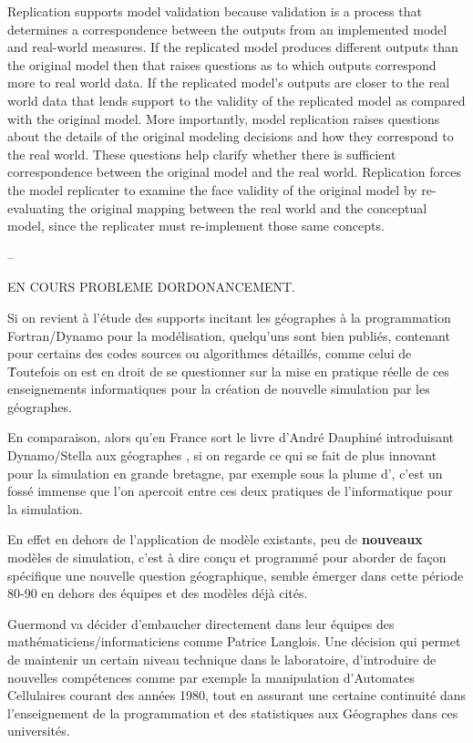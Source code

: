 




Replication supports model validation because validation is a process that determines a correspondence between the outputs from an implemented model and real-world measures. If the replicated model produces different outputs than the original model then that raises questions as to which outputs correspond more to real world data. If the replicated model's outputs are closer to the real world data that lends support to the validity of the replicated model as compared with the original model. More importantly, model replication raises questions about the details of the original modeling decisions and how they correspond to the real world. These questions help clarify whether there is sufficient correspondence between the original model and the real world. Replication forces the model replicater to examine the face validity of the original model by re-evaluating the original mapping between the real world and the conceptual model, since the replicater must re-implement those same concepts.


--

EN COURS PROBLEME DORDONANCEMENT.

Si on revient à l'étude des supports incitant les géographes à la programmation Fortran/Dynamo pour la modélisation, quelqu'uns sont bien publiés, contenant pour certains des codes sources ou algorithmes détaillés, comme celui de \. Toutefois on est en droit de se questionner sur la mise en pratique réelle de ces enseignements informatiques pour la création de nouvelle simulation par les géographes.

En comparaison, alors qu'en France sort le livre d'André Dauphiné introduisant Dynamo/Stella aux géographes \autocite{Dauphine1987}, si on regarde ce qui se fait de plus innovant pour la simulation en grande bretagne, par exemple sous la plume d'\textcites{Openshaw1983, Openshaw1988, Openshaw2000}, c'est un fossé immense que l'on apercoit entre ces deux pratiques de l'informatique pour la simulation.


 En effet en dehors de l'application de modèle existants, peu de \textbf{nouveaux} modèles de simulation, c'est à dire conçu et programmé pour aborder de façon spécifique une nouvelle question géographique, semble émerger dans cette période 80-90 en dehors des équipes et des modèles déjà cités.


Guermond va décider d'embaucher directement dans leur équipes des mathématiciens/informaticiens comme Patrice Langlois. Une décision qui permet de maintenir un certain niveau technique dans le laboratoire, d’introduire de nouvelles compétences comme par exemple la manipulation d'Automates Cellulaires courant des années 1980, tout en assurant une certaine continuité dans l’enseignement de la programmation et des statistiques aux Géographes dans ces universités.



